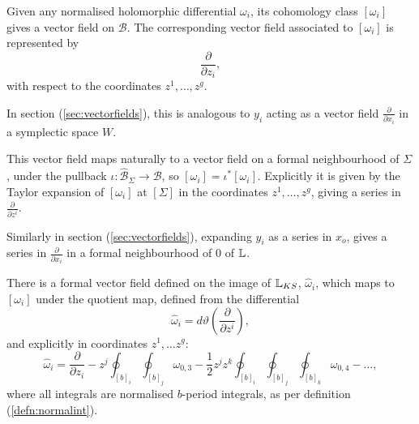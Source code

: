     Given any normalised holomorphic differential \( \omega_i\), its cohomology class \( [\omega_i]\) gives a vector field on \( \mathcal{B}\). The corresponding vector field associated to \([\omega_i]\) is represented by
    \[ \frac{\partial}{\partial z_i},\] with respect to the coordinates \( z^1,\dots,z^g\). 
    
    \begin{rem} In section (\ref{sec:vectorfields}), this is analogous to \(y_i\) acting as a vector field \( \frac{\partial}{\partial x_i}\) in a symplectic space \(W\).
    \end{rem} 
    
    This vector field maps naturally to a vector field on a formal neighbourhood of \( \Sigma\), under the pullback \( \iota : \widehat{\mathcal{B}}_\Sigma \rightarrow \mathcal{B}\), so
    \( [\omega_i]=\iota^*[\omega_i]\). Explicitly it is given by the Taylor expansion of \([\omega_i]\) at \([\Sigma]\) in the coordinates \( z^1, \dots , z^g\), giving a series in \( \frac{\partial}{\partial z^i}\).
    
    \begin{rem} Similarly in section (\ref{sec:vectorfields}), expanding \(y_i\) as a series in \(x_o\), gives a series in \( \frac{\partial}{\partial x_i}\) in a formal neighbourhood of \(0\) of \( \mathbb{L}\).
    \end{rem} 

    There is a formal vector field defined on the image of \( \mathbb{L}_{KS}\), \(\widehat{\omega}_i\), which maps to \([\omega_i]\) under the quotient map, defined from the differential 
    \begin{equation} 
        \widehat{\omega}_i=d\vartheta\left(\frac{\partial}{\partial z^i}\right),
    \end{equation} 
    and explicitly in coordinates \(z^1, \dots z^g\):
    \begin{equation}  
    \label{eqn:hatomegavectfields}
        \widehat{\omega}_i=\frac{\partial}{\partial z_i}-z^j\oint_{[b]_i}\oint_{[b]_j}\omega_{0,3}-\frac{1}{2}z^j z^k\oint_{[b]_i}\oint_{[b]_j}\oint_{[b]_k}\omega_{0,4}- \dots, 
    \end{equation} 
    where all integrals are normalised \(b\)-period integrals, as per definition (\ref{defn:normalint}).
    
